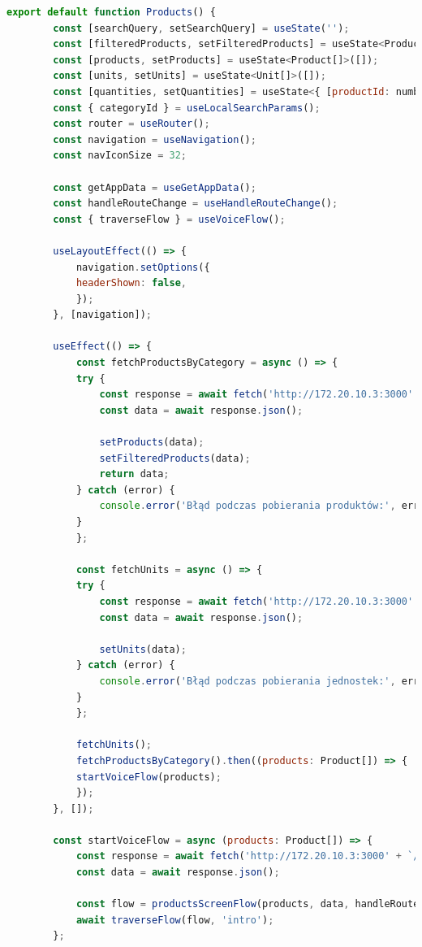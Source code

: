 \begin{lstlisting}[language=JavaScript, caption=Ekran produktów implementacja, label=lst:view]
    export default function Products() {
        const [searchQuery, setSearchQuery] = useState('');
        const [filteredProducts, setFilteredProducts] = useState<Product[]>([]);
        const [products, setProducts] = useState<Product[]>([]);
        const [units, setUnits] = useState<Unit[]>([]);
        const [quantities, setQuantities] = useState<{ [productId: number]: number }>({});
        const { categoryId } = useLocalSearchParams();
        const router = useRouter();
        const navigation = useNavigation();
        const navIconSize = 32;

        const getAppData = useGetAppData();
        const handleRouteChange = useHandleRouteChange();
        const { traverseFlow } = useVoiceFlow();

        useLayoutEffect(() => {
            navigation.setOptions({
            headerShown: false,
            });
        }, [navigation]);

        useEffect(() => {
            const fetchProductsByCategory = async () => {
            try {
                const response = await fetch('http://172.20.10.3:3000' + `/products/category/${categoryId}`);
                const data = await response.json();

                setProducts(data);
                setFilteredProducts(data);
                return data;
            } catch (error) {
                console.error('Błąd podczas pobierania produktów:', error);
            }
            };

            const fetchUnits = async () => {
            try {
                const response = await fetch('http://172.20.10.3:3000' + `/units`);
                const data = await response.json();

                setUnits(data);
            } catch (error) {
                console.error('Błąd podczas pobierania jednostek:', error);
            }
            };

            fetchUnits();
            fetchProductsByCategory().then((products: Product[]) => {
            startVoiceFlow(products);
            });
        }, []);

        const startVoiceFlow = async (products: Product[]) => {
            const response = await fetch('http://172.20.10.3:3000' + `/units`);
            const data = await response.json();

            const flow = productsScreenFlow(products, data, handleRouteChange, addToCartCommand);
            await traverseFlow(flow, 'intro');
        };


\end{lstlisting}

